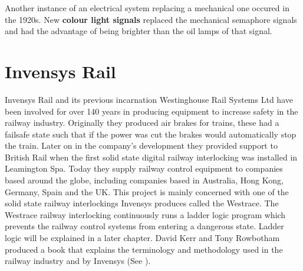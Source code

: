 Another instance of an electrical system replacing a mechanical one occured in the 1920s. New \textbf{colour light signals} replaced  the mechanical semaphore signals and had the advantage of being brighter than the oil lamps of that signal.


\begin{comment}
In the 1920s \textbf{colour light signals} replaced mechanical semaphore signals these where much brighter than the oil
lamps fitted to semaphores and greatly increased the safety of night time
train travel. In the 1930s the mechanical levers were replaced with an electronic \textbf{control panel}
containing switches and buttons. This allowed for the introduction of
\textbf{route setting} where with the press of a button configurations of signals and points would be
associated with a particular route could become activated. Prior to this time
many levers would have had to have been pulled to set many different pieces of equipment.
During the 1980s the most important advance from our point of view took
place. The advent of electronic microprocessors enabled the replacement of the
relay and mechanical interlockings with an electronic \textbf{solid state interlocking}
system (SSI) \cite{AC08}. The main focus of this project will be to investigate the safety
of such solid state interlockings.
\end{comment}
\section{Invensys Rail}

Invensys Rail \cite{Inven} and its previous incarnation Westinghouse Rail Systems Ltd have been
involved for over 140 years in producing equipment to increase safety in the
railway industry. Originally they produced air brakes for trains, these had a
failsafe state such that if the power was cut the brakes would automatically stop the train.
Later on in the company's development they provided support to British Rail
when the first solid state digital railway interlocking was installed in
Leamington Spa. Today they supply railway control equipment to companies based
around the globe, including companies based in Australia, Hong Kong,
Germany, Spain and the UK. This project is mainly concerned with one of the
solid state railway interlockings Invensys produces called the Westrace. The
Westrace railway interlocking continuously runs a ladder logic program which
prevents the railway control systems from entering a dangerous state. Ladder
logic will be explained in a later chapter.
David Kerr and Tony Rowbotham  produced a book that explains the
terminology and methodology used in the railway industry and by
Invensys (See \cite{KR01}).  


